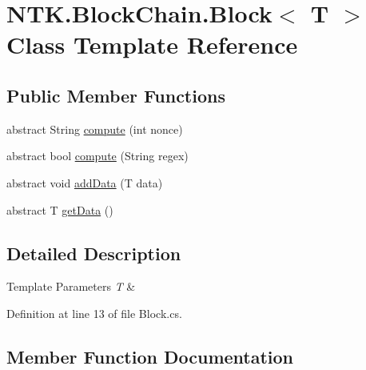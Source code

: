 \hypertarget{class_n_t_k_1_1_block_chain_1_1_block}{}\section{N\+T\+K.\+Block\+Chain.\+Block$<$ T $>$ Class Template Reference}
\label{class_n_t_k_1_1_block_chain_1_1_block}


 


\subsection*{Public Member Functions}
\begin{DoxyCompactItemize}
\item 
abstract String \mbox{\hyperlink{class_n_t_k_1_1_block_chain_1_1_block_a69385aab04a91185ff9b5590d859b5c2}{compute}} (int nonce)
\item 
abstract bool \mbox{\hyperlink{class_n_t_k_1_1_block_chain_1_1_block_a952ed49cc3da0dab71e8b1b5577c59a1}{compute}} (String regex)
\item 
abstract void \mbox{\hyperlink{class_n_t_k_1_1_block_chain_1_1_block_a9216ca842436a7a712f8748d91286003}{add\+Data}} (T data)
\item 
abstract T \mbox{\hyperlink{class_n_t_k_1_1_block_chain_1_1_block_ad65b166bcac81fb5a04e52f2d5b53f57}{get\+Data}} ()
\end{DoxyCompactItemize}


\subsection{Detailed Description}



\begin{DoxyTemplParams}{Template Parameters}
{\em T} & \\
\hline
\end{DoxyTemplParams}


Definition at line 13 of file Block.\+cs.



\subsection{Member Function Documentation}
\mbox{\label{class_n_t_k_1_1_block_chain_1_1_block_a9216ca842436a7a712f8748d91286003}} 

